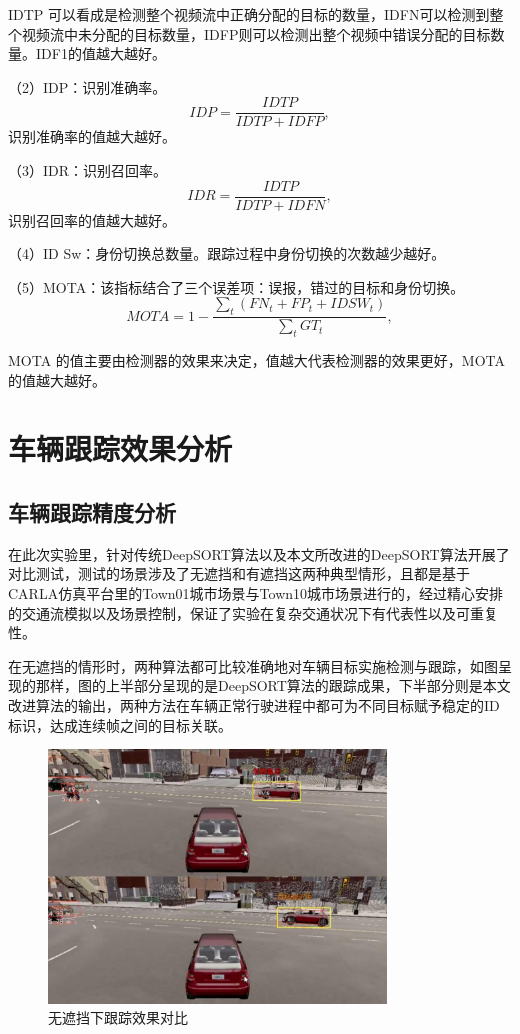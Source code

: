 IDTP 可以看成是检测整个视频流中正确分配的目标的数量，IDFN可以检测到整个视频流中未分配的目标数量，IDFP则可以检测出整个视频中错误分配的目标数量。IDF1的值越大越好。

（2）IDP：识别准确率。
\begin{equation}
	IDP = \frac{IDTP}{IDTP + IDFP},
\end{equation}
识别准确率的值越大越好。

（3）IDR：识别召回率。
\begin{equation}
	IDR = \frac{IDTP}{IDTP + IDFN},
\end{equation}
识别召回率的值越大越好。 

（4）ID Sw：身份切换总数量。跟踪过程中身份切换的次数越少越好。 

（5）MOTA：该指标结合了三个误差项：误报，错过的目标和身份切换。
\begin{equation}
	MOTA = 1 - \frac{\sum_{t}(FN_{t} + FP_{t} + IDSW_{t})}{\sum_{t}GT_{t}},
\end{equation}

MOTA 的值主要由检测器的效果来决定，值越大代表检测器的效果更好，MOTA的值越大越好。 




\section{车辆跟踪效果分析}

\subsection{车辆跟踪精度分析}

在此次实验里，针对传统DeepSORT算法以及本文所改进的DeepSORT算法开展了对比测试，测试的场景涉及了无遮挡和有遮挡这两种典型情形，且都是基于CARLA仿真平台里的Town01城市场景与Town10城市场景进行的，经过精心安排的交通流模拟以及场景控制，保证了实验在复杂交通状况下有代表性以及可重复性。

在无遮挡的情形时，两种算法都可比较准确地对车辆目标实施检测与跟踪，如图呈现的那样，图的上半部分呈现的是DeepSORT算法的跟踪成果，下半部分则是本文改进算法的输出，两种方法在车辆正常行驶进程中都可为不同目标赋予稳定的ID标识，达成连续帧之间的目标关联。
\begin{figure}[H]
	\centering
	\includegraphics[width=0.8\textwidth]{images/未遮挡.pdf}  %
	\caption{无遮挡下跟踪效果对比}
	\label{fig:nocover}  %
\end{figure}

